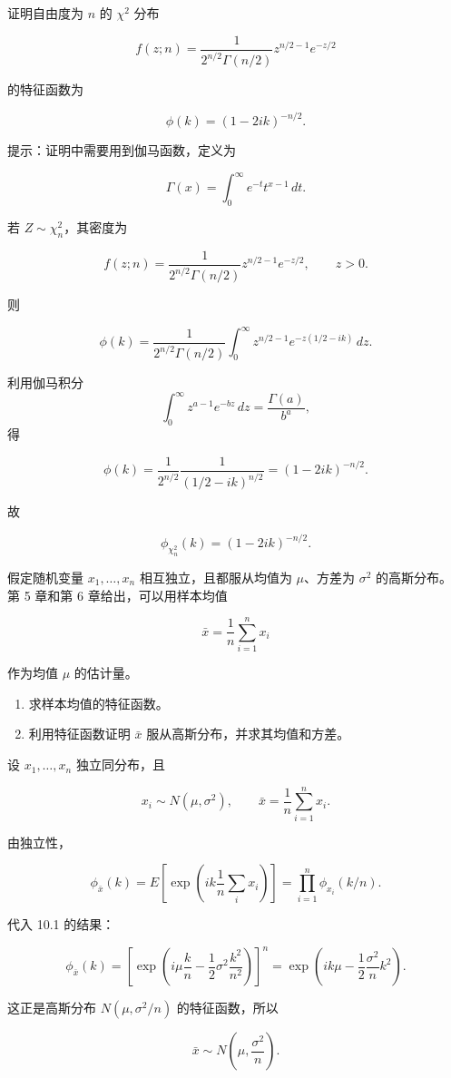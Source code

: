 \begin{question}
证明自由度为 \(n\) 的 \(\chi^2\) 分布

\[
f(z;n)=\frac{1}{2^{n/2}\Gamma(n/2)}z^{n/2-1}e^{-z/2}
\]

的特征函数为

\[
\phi(k)=(1-2ik)^{-n/2}.
\]

提示：证明中需要用到伽马函数，定义为

\[
\Gamma(x)=\int_0^\infty e^{-t}t^{x-1}\,dt.
\]
\begin{solution}
若 \(Z\sim \chi^2_n\)，其密度为

\[
f(z;n)=\frac{1}{2^{n/2}\Gamma(n/2)}z^{n/2-1}e^{-z/2},\qquad z>0.
\]

则

\[
\phi(k)=\frac{1}{2^{n/2}\Gamma(n/2)}
\int_0^\infty z^{n/2-1}e^{-z(1/2-ik)}\,dz.
\]

利用伽马积分 \[
\int_0^\infty z^{a-1}e^{-bz}\,dz=\frac{\Gamma(a)}{b^a},
\] 得

\[
\phi(k)=\frac{1}{2^{n/2}}\frac{1}{(1/2-ik)^{n/2}}
=(1-2ik)^{-n/2}.
\]

故

\[
\phi_{\chi^2_n}(k)=(1-2ik)^{-n/2}.
\]
\end{solution}
\end{question}


\begin{question}
假定随机变量 \(x_1,\ldots,x_n\) 相互独立，且都服从均值为 \(\mu\)、方差为
\(\sigma^2\) 的高斯分布。第 5 章和第 6 章给出，可以用样本均值

\[
\bar x=\frac1n\sum_{i=1}^{n}x_i
\]

作为均值 \(\mu\) 的估计量。

\begin{enumerate}
\item 求样本均值的特征函数。

\item 利用特征函数证明 \(\bar x\) 服从高斯分布，并求其均值和方差。
\end{enumerate}
\begin{solution}
设 \(x_1,\dots,x_n\) 独立同分布，且

\[
x_i\sim N(\mu,\sigma^2),\qquad \bar x=\frac1n\sum_{i=1}^n x_i.
\]

由独立性，

\[
\phi_{\bar x}(k)
=E\!\left[\exp\!\left(ik\frac1n\sum_i x_i\right)\right]
=\prod_{i=1}^n \phi_{x_i}(k/n).
\]

代入 10.1 的结果：

\[
\phi_{\bar x}(k)
=\left[\exp\!\left(i\mu\frac{k}{n}-\frac12\sigma^2\frac{k^2}{n^2}\right)\right]^n
=\exp\!\left(ik\mu-\frac12\frac{\sigma^2}{n}k^2\right).
\]

这正是高斯分布 \(N(\mu,\sigma^2/n)\) 的特征函数，所以

\[
\bar x\sim N\!\left(\mu,\frac{\sigma^2}{n}\right).
\]
\end{solution}
\end{question}


